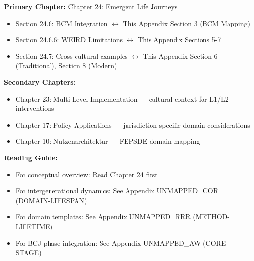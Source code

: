 \begin{tcolorbox}[colback=purple!5!white, colframe=purple!75!black, title=Chapter Linkage]

\textbf{Primary Chapter:} Chapter 24: Emergent Life Journeys
\begin{itemize}[nosep]
\item Section 24.6: BCM Integration $\leftrightarrow$ This Appendix Section 3 (BCM Mapping)
\item Section 24.6.6: WEIRD Limitations $\leftrightarrow$ This Appendix Sections 5-7
\item Section 24.7: Cross-cultural examples $\leftrightarrow$ This Appendix Section 6 (Traditional), Section 8 (Modern)
\end{itemize}

\textbf{Secondary Chapters:}
\begin{itemize}[nosep]
\item Chapter 23: Multi-Level Implementation --- cultural context for L1/L2 interventions
\item Chapter 17: Policy Applications --- jurisdiction-specific domain considerations
\item Chapter 10: Nutzenarchitektur --- FEPSDE-domain mapping
\end{itemize}

\textbf{Reading Guide:}
\begin{itemize}[nosep]
\item For conceptual overview: Read Chapter 24 first
\item For intergenerational dynamics: See Appendix UNMAPPED_COR (DOMAIN-LIFESPAN)
\item For domain templates: See Appendix UNMAPPED_RRR (METHOD-LIFETIME)
\item For BCJ phase integration: See Appendix UNMAPPED_AW (CORE-STAGE)
\end{itemize}

\end{tcolorbox}



